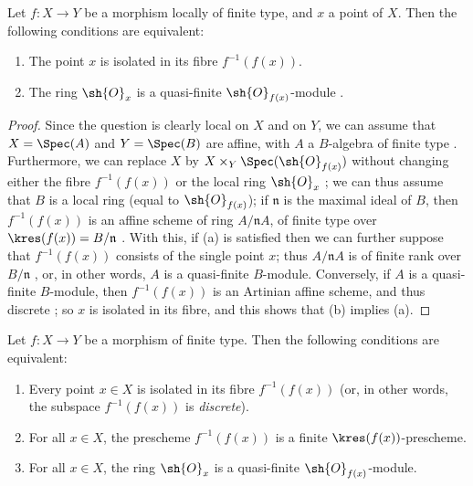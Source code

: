 \begin{proposition}[6.2.1]
\label{II.6.2.1}
Let $f:X\to Y$ be a morphism locally of finite type, and $x$ a point of $X$.
Then the following conditions are equivalent:
\begin{enumerate}
  \item[a)] The point $x$ is isolated in its fibre $f^{-1}(f(x))$.
  \item[b)] The ring $\sh{O}_x$ is a quasi-finite $\sh{O}_{f(x)}$-module .
\end{enumerate}
\end{proposition}

\begin{proof}
Since the question is clearly local on $X$ and on $Y$, we can assume that $X=\Spec(A)$ and $Y=\Spec(B)$ are affine, with $A$ a $B$-algebra of finite type .
Furthermore, we can replace $X$ by $X\times_Y\Spec(\sh{O}_{f(x)})$ without changing either the fibre $f^{-1}(f(x))$ or the local ring $\sh{O}_x$ ;
we can thus assume that $B$ is a local ring (equal to $\sh{O}_{f(x)}$);
if $\mathfrak{n}$ is the maximal ideal of $B$, then $f^{-1}(f(x))$ is an affine scheme of ring $A/\mathfrak{n}A$, of finite type over $\kres(f(x))=B/\mathfrak{n}$ .
With this, if (a) is satisfied then we can further suppose that $f^{-1}(f(x))$ consists of the single point $x$;
thus $A/\mathfrak{n}A$ is of finite rank over $B/\mathfrak{n}$ , or, in other words, $A$ is a quasi-finite $B$-module.
Conversely, if $A$ is a quasi-finite $B$-module, then $f^{-1}(f(x))$ is an Artinian affine scheme, and thus discrete ;
so $x$ is isolated in its fibre, and this shows that (b) implies (a).
\end{proof}

\begin{corollary}[6.2.2]
\label{II.6.2.2}
Let $f:X\to Y$ be a morphism of finite type.
Then the following conditions are equivalent:
\begin{enumerate}
  \item[a)] Every point $x\in X$ is isolated in its fibre $f^{-1}(f(x))$ (or, in other words, the subspace $f^{-1}(f(x))$ is \emph{discrete}).
  \item[b)] For all $x\in X$, the prescheme $f^{-1}(f(x))$ is a finite $\kres(f(x))$-prescheme.
  \item[c)] For all $x\in X$, the ring $\sh{O}_x$ is a quasi-finite $\sh{O}_{f(x)}$-module.
\end{enumerate}
\end{corollary}

